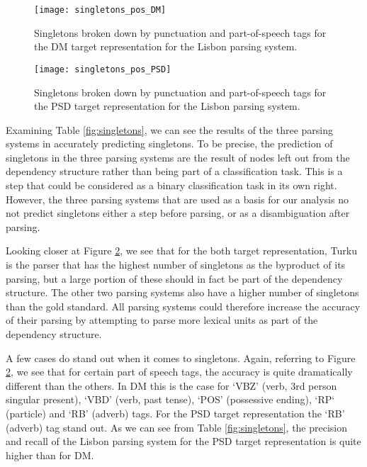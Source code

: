 \begin{figure}[h]
    \centering
    \begin{minipage}{0.8\textwidth}
        \centering
        \texttt{[image: singletons\_pos\_DM]}
    \end{minipage}\hfill
    \caption{Singletons broken down by punctuation and part-of-speech tags for the DM target representation for the Lisbon parsing system.}
    \label{fig:singletons_pos}
\end{figure}

\begin{figure}[h]
    \centering
    \begin{minipage}{0.8\textwidth}
        \centering
        \texttt{[image: singletons\_pos\_PSD]}
    \end{minipage}
    \caption{Singletons broken down by punctuation and part-of-speech tags for the PSD target representation for the Lisbon parsing system.}
    \label{fig:singletons_pos}
\end{figure}

Examining Table \ref{fig:singletons}, we can see the results of the three parsing systems in accurately predicting singletons. To be precise, the prediction of singletons in the three parsing systems are the result of nodes left out from the dependency structure rather than being part of a classification task. This is a step that could be considered as a binary classification task in its own right. However, the three parsing systems that are used as a basis for our analysis no not predict singletons either a step before parsing, or as a disambiguation after parsing.

Looking closer at Figure \ref{fig:singletons_pos}, we see that for the both target representation, Turku is the parser that has the highest number of singletons as the byproduct of its parsing, but a large portion of these should in fact be part of the dependency structure. The other two parsing systems also have a higher number of singletons than the gold standard. All parsing systems could therefore increase the accuracy of their parsing by attempting to parse more lexical units as part of the dependency structure.

A few cases do stand out when it comes to singletons. Again, referring to Figure \ref{fig:singletons_pos}, we see that for certain part of speech tags, the accuracy is quite dramatically different than the others. In DM this is the case for `VBZ' (verb, 3rd person singular present), `VBD' (verb, past tense), `POS' (possessive ending), `RP` (particle) and `RB' (adverb) tags. For the PSD target representation the `RB' (adverb) tag stand out. As we can see from Table \ref{fig:singletons}, the precision and recall of the Lisbon parsing system for the PSD target representation is quite higher than for DM.

